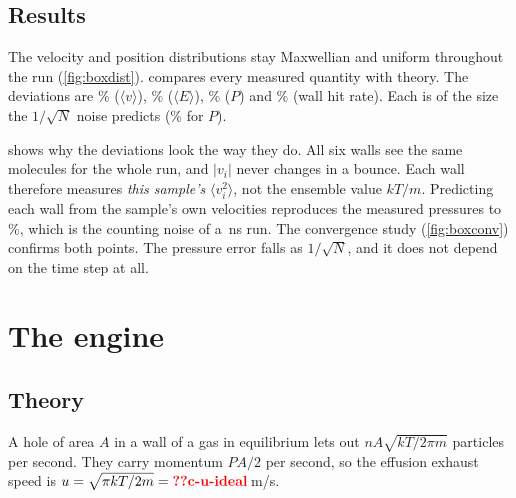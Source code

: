 \documentclass[aps,prd,twocolumn,nofootinbib,floatfix,superscriptaddress]{revtex4-2}
\begin{document}
\subsection{Results}
The velocity and position distributions stay Maxwellian and uniform throughout the run (\cref{fig:boxdist}).
 compares every measured quantity with theory.
The deviations are \% ($\langle v\rangle$), \% ($\langle E\rangle$), \% ($P$) and \% (wall hit rate).
Each is of the size the $1/\sqrt N$ noise predicts (\% for $P$).

 shows why the deviations look the way they do.
All six walls see the same molecules for the whole run, and $|v_i|$ never changes in a bounce.
Each wall therefore measures \emph{this sample's} $\langle v_i^2\rangle$, not the ensemble value $kT/m$.
Predicting each wall from the sample's own velocities reproduces the measured pressures to \%, which is the counting noise of a \,ns run.
The convergence study (\cref{fig:boxconv}) confirms both points.
The pressure error falls as $1/\sqrt N$, and it does not depend on the time step at all.


\section{The engine}\label{sec:engine}
\subsection{Theory}
A hole of area $A$ in a wall of a gas in equilibrium lets out $nA\sqrt{kT/2\pi m}$ particles per second.
They carry momentum $PA/2$ per second, so the effusion exhaust speed is $u=\sqrt{\pi kT/2m}=\val{c-u-ideal}$\,m/s.
\end{document}

